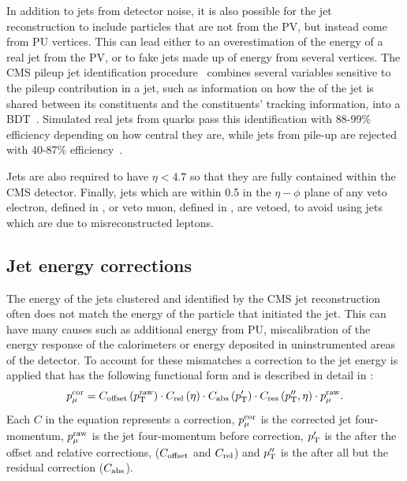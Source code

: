 In addition to jets from detector noise, it is also possible for the jet reconstruction to include particles that are not from the \ac{PV}, but instead come from \ac{PU} vertices. This can lead either to an overestimation of the energy of a real jet from the \ac{PV}, or to fake jets made up of energy from several vertices. The CMS pileup jet identification procedure~\cite{CMS-PAS-JME-13-005} combines several variables sensitive to the pileup contribution in a jet, such as information on how the \pt of the jet is shared between its constituents and the constituents' tracking information, into a \ac{BDT}~\cite{TMVA}. Simulated real jets from quarks pass this identification with 88-99\% efficiency depending on how central they are, while jets from pile-up are rejected with 40-87\% efficiency~\cite{CMS-PAS-JME-13-005}.

Jets are also required to have $\eta<4.7$ so that they are fully contained within the CMS detector. Finally, jets which are within 0.5 in the $\eta-\phi$ plane of any veto electron, defined in , or veto muon, defined in , are vetoed, to avoid using jets which are due to misreconstructed leptons.

\subsection{Jet energy corrections}
\label{sec:jec}
The energy of the jets clustered and identified by the CMS jet reconstruction often does not match the energy of the particle that initiated the jet. This can have many causes such as additional energy from \ac{PU}, miscalibration of the energy response of the calorimeters or energy deposited in uninstrumented areas of the detector. To account for these mismatches a correction to the jet energy is applied that has the following functional form and is described in detail in : 
\begin{equation}
  p_{\mu}^{\rm{cor}}=C_{\rm{offset}}\left(p_{\mathrm{T}}^{\rm{raw}}\right)\cdot C_{\rm{rel}}\left(\eta\right)\cdot C_{\rm{abs}}\left(p_{\mathrm{T}}'\right)\cdot C_{\rm{res}}\left(p_{\mathrm{T}}'',\eta\right)\cdot p_{\mu}^{\rm{raw}}.
\end{equation}
Each $C$ in the equation represents a correction, $p_{\mu}^{\rm{cor}}$ is the corrected jet four-momentum, $p_{\mu}^{\rm{raw}}$ is the jet four-momentum before correction, $p_{\mathrm{T}}'$ is the \pt after the offset and relative corrections, ($C_{\rm{offset}}$ and $C_{\rm{rel}}$) and $p_{\mathrm{T}}''$ is the \pt after all but the residual correction ($C_{\rm{abs}}$).

